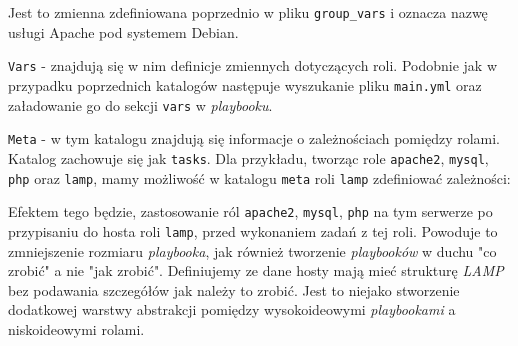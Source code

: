 \begin{description}
		Jest to zmienna zdefiniowana poprzednio w pliku \texttt{group\_vars} i oznacza nazwę usługi Apache pod systemem Debian.
	\item{\texttt{Vars}} - znajdują się w nim definicje zmiennych dotyczących roli.
		Podobnie jak w przypadku poprzednich katalogów następuje wyszukanie pliku \texttt{main.yml} oraz załadowanie go do sekcji \texttt{vars} w \textit{playbooku}.
	\item{\texttt{Meta}} - w tym katalogu znajdują się informacje o zależnościach pomiędzy rolami.
		Katalog zachowuje się jak \texttt{tasks}.
		Dla przykładu, tworząc role \texttt{apache2}, \texttt{mysql}, \texttt{php} oraz \texttt{lamp}, mamy możliwość w katalogu \texttt{meta} roli \texttt{lamp} zdefiniować zależności:
		
		Efektem tego będzie, zastosowanie ról \texttt{apache2}, \texttt{mysql}, \texttt{php} na tym serwerze po przypisaniu do hosta roli \texttt{lamp}, przed wykonaniem zadań z tej roli.
		Powoduje to zmniejszenie rozmiaru \textit{playbooka}, jak również tworzenie \textit{playbooków} w duchu "co zrobić" a nie "jak zrobić".
		Definiujemy ze dane hosty mają mieć strukturę \textit{LAMP} bez podawania szczegółów jak należy to zrobić.
		Jest to niejako stworzenie dodatkowej warstwy abstrakcji pomiędzy wysokoideowymi \textit{playbookami} a niskoideowymi rolami.\\
		
\end{description}
